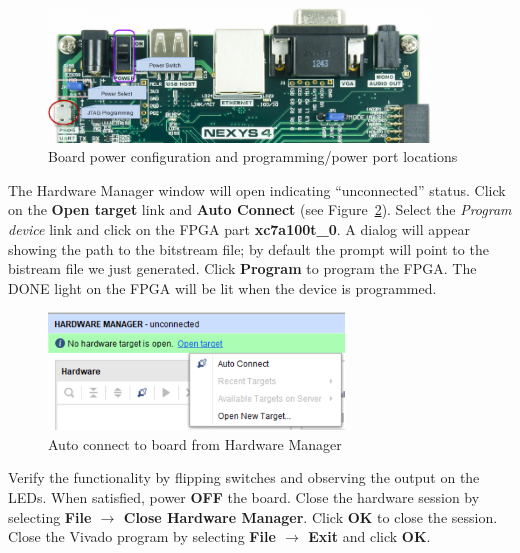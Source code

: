 \documentclass[11pt]{article}
\begin{document}
\begin{figure}[!h]
    \centering
    \includegraphics[width=0.9\textwidth]{images/board_power.png}
    \caption{Board power configuration and programming/power port locations}
    \label{fig:board_power}
\end{figure}

The Hardware Manager window will open indicating “unconnected” status. Click on the \textbf{Open target} link and \textbf{Auto Connect} (see Figure~\ref{fig:auto_connect}). Select the \textit{Program device} link and click on the FPGA part \textbf{xc7a100t\_0}. A dialog will appear showing the path to the bitstream file; by default the prompt will point to the bistream file we just generated. Click \textbf{Program} to program the FPGA. The DONE light on the FPGA will be lit when the device is programmed.

\begin{figure}[!h]
    \centering
    \includegraphics[width=0.7\textwidth]{images/auto_connect.png}
    \caption{Auto connect to board from Hardware Manager}
    \label{fig:auto_connect}
\end{figure}

Verify the functionality by flipping switches and observing the output on the LEDs. When satisfied, power \textbf{OFF} the board. Close the hardware session by selecting \textbf{File $\rightarrow$ Close Hardware Manager}. Click \textbf{OK} to close the session. Close the Vivado program by selecting \textbf{File $\rightarrow$ Exit} and click \textbf{OK}.
\end{document}
